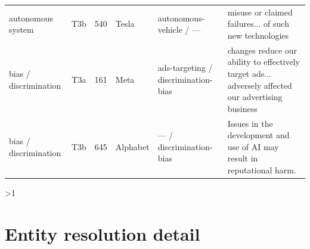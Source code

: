 \documentclass[11pt]{article}
\let\oldsection\section
\newcounter{supsec}
\renewcommand{\section}[1]{\stepcounter{supsec}\ifnum\value{supsec}>1\clearpage\fi\oldsection*{#1}}
\begin{document}
\begin{table}[H]
\begin{center}
\begin{tabular}{@{}p{1.9cm}cr p{1.7cm} p{2.5cm} p{4.6cm}@{}}
autonomous system & T3b & 540 & Tesla & autonomous-vehicle / --- & misuse or claimed failures... of such new technologies \\
bias / discrimination & T3a & 161 & Meta & ads-targeting / discrimination-bias & changes reduce our ability to effectively target ads... adversely affected our advertising business \\
bias / discrimination & T3b & 645 & Alphabet & --- / discrimination-bias & Issues in the development and use of AI may result in reputational harm. \\
\bottomrule
\end{tabular}
\end{center}
\end{table}

\section{Entity resolution detail}
\end{document}
